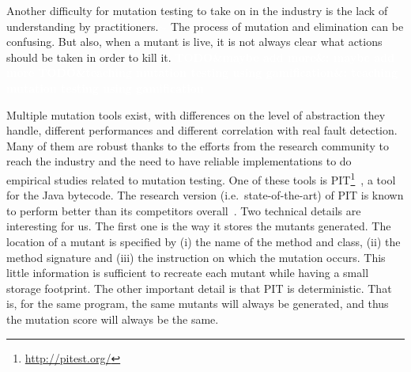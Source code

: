 \documentclass[11pt]{sdm_internship}
\newcommand{\todo}[1]{\colorbox{Red!75}{\textcolor{white}{\textbf{TODO\ifx&#1&\else: #1\fi}}}}
\newcommand{\rephrase}[1]{\colorbox{BlueViolet!60}{\textcolor{white}{\textbf{$\sim$#1}}}}
\theoremstyle{definition}
\begin{document}
Another difficulty for mutation testing to take on in the industry is the lack of understanding by practitioners.\rephrase{}
The process of mutation and elimination can be confusing.
But also, when a mutant is live, it is not always clear what actions should be taken in order to kill it.
\todo{maybe add more}
\todo{teaching mutation testing using gamification}

Multiple mutation tools exist, with differences on the level of abstraction they handle, different performances and different correlation with real fault detection.
Many of them are robust thanks to the efforts from the research community to reach the industry and the need to have reliable implementations to do\rephrase{} empirical studies related to mutation testing.
One of these tools is PIT\footnote{\url{http://pitest.org/}}~\cite{coles2016pit}, a tool for the Java bytecode.
The research version (i.e.\ state-of-the-art) of PIT is known to perform better than its competitors overall~\cite{kintis2017effective}.
Two technical details are interesting for us.
The first one is the way it stores the mutants generated.
The location of a mutant is specified by (i) the name of the method and class, (ii) the method signature and (iii) the instruction on which the mutation occurs.
This little information is sufficient to recreate each mutant while having a small storage footprint.
The other important detail is that PIT is deterministic.
That is, for the same program, the same mutants will always be generated, and thus the mutation score will always be the same.
\end{document}
